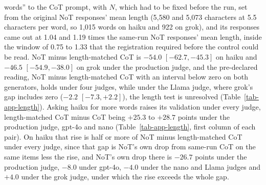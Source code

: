 words'' to the CoT prompt, with $N$, which had to be fixed before the run, set
from the original NoT responses' mean length (5,580 and 5,073 characters at 5.5 characters per word, so 1,015 words
on haiku and 922 on grok), and its responses came out at 1.04 and 1.19 times
the same-run NoT responses' mean length, inside the window of 0.75 to 1.33
that the registration required before the control could be read.
NoT minus length-matched CoT is $-54.0$ $[-62.7, -45.3]$ on haiku and $-46.5$
$[-54.9, -38.0]$ on grok under the production judge, and the pre-declared
reading, NoT minus length-matched CoT with an interval below zero on both
generators, holds under four judges, while under the Llama judge, where
grok's gap includes zero ($-2.2$ $[-7.3, +2.2]$), the length test is
unresolved (Table~\ref{tab-app-length}).
Asking haiku for more words raises its validation under every judge,
length-matched CoT minus CoT being $+25.3$ to $+28.7$ points under the
production judge, gpt-4o and nano (Table~\ref{tab-app-length}, first column
of each pair).
On haiku that rise is half or more of NoT minus length-matched CoT under every
judge, since that gap is NoT's own drop from same-run CoT on the same items
less the rise, and NoT's own drop there is $-26.7$ points under the
production judge, $-8.0$ under gpt-4o, $-4.0$ under the nano and Llama judges
and $+4.0$ under the grok judge, under which the rise exceeds the whole gap.

